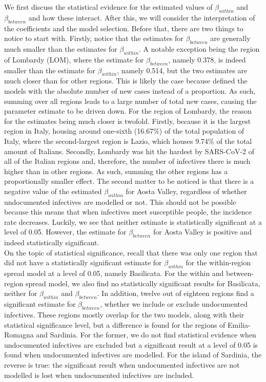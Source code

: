 \documentclass[12pt]{article}
\begin{document}
	We first discuss the statistical evidence for the estimated values of $\beta_{within}$ and $\beta_{between}$ and how these interact. After this, we will consider the interpretation of the coefficients and the model selection. Before that, there are two things to notice to start with. Firstly, notice that the estimates for $\beta_{between}$ are generally much smaller than the estimates for $\beta_{within}$. A notable exception being the region of Lombardy (LOM), where the estimate for $\beta_{between}$, namely 0.378, is indeed smaller than the estimate for $\beta_{within}$, namely 0.514, but the two estimates are much closer than for other regions. This is likely the case because \textcite{adda2016economic} defined the models with the absolute number of new cases instead of a proportion. As such, summing over all regions leads to a large number of total new cases, causing the parameter estimate to be driven down. For the region of Lombardy, the reason for the estimates being much closer is twofold. Firstly, because it is the largest region in Italy, housing around one-sixth (16.67\%) of the total population of Italy, where the second-largest region is Lazio, which houses 9.74\% of the total amount of Italians. Secondly, Lombardy was hit the hardest by SARS-CoV-2 of all of the Italian regions and, therefore, the number of infectives there is much higher than in other regions. As such, summing the other regions has a proportionally smaller effect. The second matter to be noticed is that there is a negative value of the estimated $\beta_{within}$ for Aosta Valley, regardless of whether undocumented infectives are modelled or not. This should not be possible because this means that when infectives meet susceptible people, the incidence rate decreases. Luckily, we see that neither estimate is statistically significant at a level of 0.05. However, the estimate for $\beta_{between}$ for Aosta Valley is positive and indeed statistically significant.\\
	
	On the topic of statistical significance, recall that there was only one region that did not have a statistically significant estimate for $\beta_{within}$ for the within-region spread model at a level of 0.05, namely Basilicata. For the within and between-region spread model, we also find no statistically significant results for Basilicata, neither for $\beta_{within}$ and $\beta_{between}$. In addition, twelve out of eighteen regions find a significant estimate for $\beta_{between}$, whether we include or exclude undocumented infectives. These regions mostly overlap for the two models, along with their statistical significance level, but a difference is found for the regions of Emilia-Romagna and Sardinia. For the former, we do not find statistical evidence when undocumented infectives are excluded but a significant result at a level of 0.05 is found when undocumented infectives are modelled. For the island of Sardinia, the reverse is true: the significant result when undocumented infectives are not modelled is lost when undocumented infectives are included. \\
	
\end{document}
